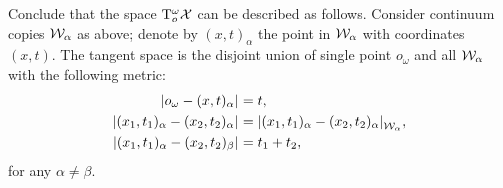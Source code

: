 Conclude that the space $\mathrm{T}^\omega_o\mathcal{X}$ can be described as follows.
Consider continuum copies $\mathcal{W}_\alpha$ as above;
denote by $(x,t)_\alpha$ the point in $\mathcal{W}_\alpha$ with coordinates $(x,t)$.
The tangent space is the disjoint union of single point $o_\omega$ and all $\mathcal{W}_\alpha$ with the following metric:
\begin{align*}
\dist{o_\omega}{(x,t)_\alpha}{}&=t,
\\
\dist{(x_1,t_1)_\alpha}{(x_2,t_2)_\alpha}{}&=\dist{(x_1,t_1)_\alpha}{(x_2,t_2)_\alpha}{\spc{W}_\alpha},
\\
\dist{(x_1,t_1)_\alpha}{(x_2,t_2)_\beta}{}&=t_1+t_2,
\end{align*}
for any $\alpha\ne\beta$.
